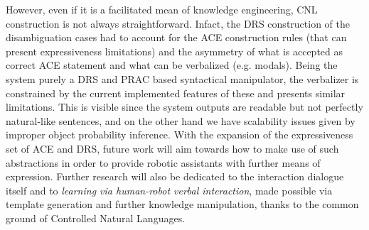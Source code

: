 \documentclass[oribibl]{llncs}
\begin{document}
However, even if it is a facilitated mean of knowledge engineering, CNL construction is not always straightforward\cite{Schwitter05alayered}. Infact, the DRS construction of the disambiguation cases had to account for the ACE construction rules (that can present expressiveness limitations) and the asymmetry of what is accepted as correct ACE statement and what can be verbalized (e.g. modals). Being the system purely a DRS\cite{drslatest} and PRAC based syntactical manipulator, the verbalizer is constrained by the current implemented features of these and presents similar limitations. This is visible since the system outputs are readable but not perfectly natural-like sentences, and on the other hand we have scalability issues given by improper object probability inference.
With the expansion of the expressiveness set of ACE and DRS, future work will aim towards how to make use of such abstractions in order to provide robotic assistants with further means of expression.
Further research will also be dedicated to the interaction dialogue itself and to \textit{learning via human-robot verbal interaction}, made possible via template generation and further knowledge manipulation, thanks to the common ground of Controlled Natural Languages.

%
{}

%
\end{document}

